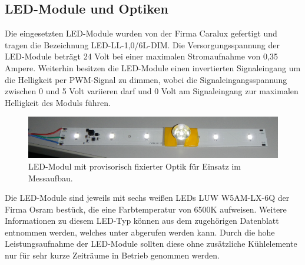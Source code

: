 \documentclass[a4paper,12pt]{scrartcl}
\begin{document}
\subsection{LED-Module und Optiken}
Die eingesetzten LED-Module wurden von der Firma Caralux gefertigt und tragen die Bezeichnung LED-LL-1,0/6L-DIM. Die Versorgungsspannung der LED-Module
betr\"agt 24 Volt bei einer maximalen Stromaufnahme von 0,35 Ampere. Weiterhin besitzen die LED-Module einen invertierten Signaleingang um die Helligkeit per
PWM-Signal zu dimmen, wobei die Signaleingangsspannung zwischen 0 und 5 Volt variieren darf und 0 Volt am Signaleingang zur maximalen Helligkeit des Moduls
f\"uhren. 

\begin{figure}[htb]
\begin{center}
  \includegraphics[width=1\hsize]{./images/foto_hardware_ledmodul.png}
\end{center}
\caption[LED-Modul der Firma Caralux mit provisorisch fixierter Optik im Messaufbau, Quelle: Autor]{\label{fotohwledmodul}LED-Modul mit provisorisch fixierter
Optik f\"ur Einsatz im Messaufbau.}
\end{figure}
Die LED-Module sind jeweils mit sechs wei\ss{}en LEDs LUW W5AM-LX-6Q der Firma Osram best\"uck, die eine Farbtemperatur von 6500K aufweisen. Weitere Informationen zu diesem LED-Typ k\"onnen aus dem zugeh\"origen Datenblatt entnommen werden, welches unter \cite{specled} abgerufen werden kann. Durch die hohe
Leistungsaufnahme der LED-Module sollten diese ohne zus\"atzliche K\"uhlelemente nur f\"ur sehr kurze Zeitr\"aume in Betrieb genommen werden.
\end{document}
